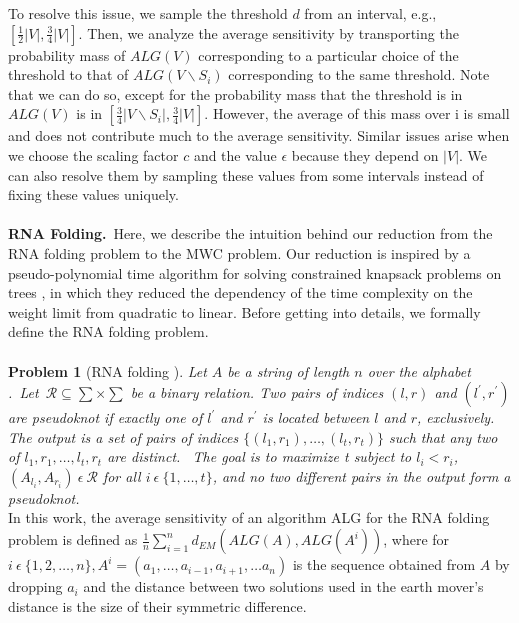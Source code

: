 \documentclass[preprint, 11pt]{article}
\begin{document}
To resolve this issue, we sample the threshold $d$ from an interval, e.g., $[\frac{1}{2}|V|, \frac{3}{4}|V|].$ Then, we
analyze the average sensitivity by transporting the probability mass of $ALG(V)$ corresponding to a particular choice of the threshold to that of $ALG(V \backslash S_i)$ corresponding to the same threshold.
Note that we can do so, except for the probability mass that the threshold is in $ALG(V)$ is in $[\frac{3}{4}|V\backslash S_i|, \frac{3}{4}|V|].$ However, the average of this mass over i is small and does not contribute much
to the average sensitivity.
Similar issues arise when we choose the scaling factor $c$ and the value $\epsilon$ because they depend on
$|V|$. We can also resolve them by sampling these values from some intervals instead of fixing these
values uniquely.\\
\\
\textbf{RNA Folding.}\   Here, we describe the intuition behind our reduction from the RNA folding
problem to the MWC problem. Our reduction is inspired by a pseudo-polynomial time algorithm
for solving constrained knapsack problems on trees \cite{11}, in which they reduced the dependency of
the time complexity on the weight limit from quadratic to linear. Before getting into details, we
formally define the RNA folding problem.\\
\\
\textbf{Problem 1} (RNA folding \cite{14}). \textit{Let $A$ be a string of length $n$ over the alphabet \sum .\  Let\  $\mathcal{R}  \subseteq \sum \times \sum$ be a binary relation. Two pairs of indices $(l, r)$ and $(l^{'}, r^{'})$ are \textnormal{pseudoknot} if exactly one of $l^'$ and $r^'$
is located between $l$ and $r$, exclusively. The output is a set of pairs of indices $\{(l_1, r_1), \ldots , (l_t, r_t)\}$ such that any two of $l_1, r_1, \ldots , l_t, r_t$ are distinct. \ The goal is to maximize t subject to $l_i < r_i$, $(A_{l_i}, A_{r_i})\  \epsilon \ \mathcal{R}$ for all $i \ \epsilon\  \{1, \ldots, t\}$, and no two different pairs in the output form a pseudoknot.}\\

In this work, the average sensitivity of an algorithm ALG for the RNA folding problem is defined
as $\frac{1}{n}\sum_{i = 1}^n d_{EM}(ALG(A), ALG(A^i))$, where for $i \ \epsilon\  \{1, 2, \ldots, n\}, A^i = (a_1, \ldots, a_{i - 1}, a_{i+1}, \ldots a_n)$ is the
sequence obtained from $A$ by dropping $a_i$ and the distance between two solutions used in the earth
mover’s distance is the size of their symmetric difference.
\end{document}
